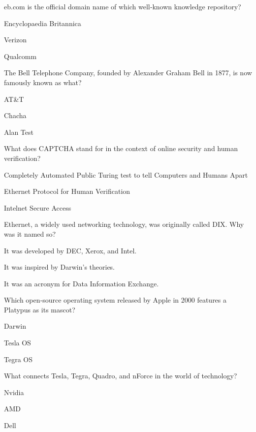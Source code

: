 \begin{enhancedmcq}{eb.com is the official domain name of which well‑known knowledge repository?}
\item Encyclopaedia Britannica
\item Verizon
\item Qualcomm

\end{enhancedmcq}
\begin{enhancedmcq}{The Bell Telephone Company, founded by Alexander Graham Bell in 1877, is now famously known as what?}
\item AT&T
\item Chacha
\item Alan Test

\end{enhancedmcq}
\begin{enhancedmcq}{What does CAPTCHA stand for in the context of online security and human verification?}
\item Completely Automated Public Turing test to tell Computers and Humans Apart
\item Ethernet Protocol for Human Verification
\item Intelnet Secure Access

\end{enhancedmcq}
\begin{enhancedmcq}{Ethernet, a widely used networking technology, was originally called DIX. Why was it named so?}
\item It was developed by DEC, Xerox, and Intel.
\item It was inspired by Darwin's theories.
\item It was an acronym for Data Information Exchange.

\end{enhancedmcq}
\begin{enhancedmcq}{Which open‑source operating system released by Apple in 2000 features a Platypus as its mascot?}
\item Darwin
\item Tesla OS
\item Tegra OS

\end{enhancedmcq}
\begin{enhancedmcq}{What connects Tesla, Tegra, Quadro, and nForce in the world of technology?}
\item Nvidia
\item AMD
\item Dell

\end{enhancedmcq}
